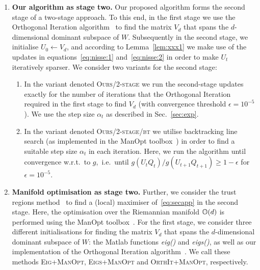 \documentclass{article}
\begin{document}
\begin{enumerate}
    \item \textbf{Our algorithm as stage two.} Our proposed algorithm forms the second stage of a two-stage approach. To this end, in the first stage we use the Orthogonal Iteration algorithm~\cite{golub2013matrix} to find the matrix $V_d$ that spans the $d$-dimensional dominant subspace of $W$. Subsequently in the second stage, we initialise $U_0 \gets V_d$, and according to Lemma~\ref{lem:xxx1} we make use of the updates in equations~\eqref{eq:nisse:1} and~\eqref{eq:nisse:2} in order to make $U_t$ iteratively sparser. We consider two variants for the second stage: 
    \begin{enumerate}
        \item In the variant  denoted \textsc{Ours/2-stage} we run the second-stage updates exactly for the  number of iterations that the Orthogonal Iteration required in the first stage to find $V_d$ (with convergence threshold $\epsilon=10^{-5}$). We use the step size $\alpha_t$ as described in Sec.~\ref{sec:exp}. 
        \item  In the variant  denoted \textsc{Ours/2-stage/bt} we utilise  backtracking line search (as implemented in the ManOpt toolbox~\cite{manopt}) in order to find a suitable step size $\alpha_t$ in each iteration. Here, we run the algorithm until convergence w.r.t.~to $g$,~i.e.~until $g(U_tQ_t)/g(U_{t+1}Q_{t+1})\geq 1 - \epsilon$ for $\epsilon = 10^{-5}$.
    \end{enumerate}
    
    \item \textbf{Manifold optimisation as stage two.} Further, we consider the trust regions method~\cite{absil2007trust} to find a (local) maximiser of~\eqref{eq:secapp} in the second stage. Here, the optimisation over the Riemannian manifold $\mathbb{O}(d)$ is performed using the ManOpt toolbox~\cite{manopt}. For the first stage, we consider three different initialisations for finding the matrix $V_d$ that spans the $d$-dimensional dominant subspace of $W$:  the Matlab functions \textit{eig()} and \textit{eigs()}, as well as our  implementation of the Orthogonal Iteration algorithm~\cite{golub2013matrix}. We call these methods \textsc{Eig+ManOpt}, \textsc{Eigs+ManOpt} and \textsc{OrthIt+ManOpt}, respectively.
    
    
    
    
   
\end{enumerate}
\end{document}
